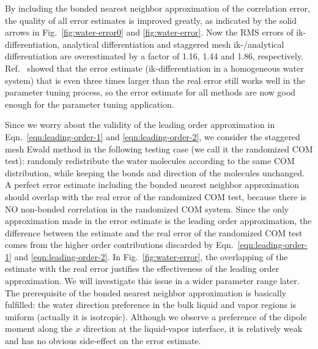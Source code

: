 \documentclass[aps,pre,preprint,unsortedaddress]{revtex4}
\newcommand{\recheck}[1]{{\color{red} #1}}
\begin{document}
By including the \recheck{bonded} nearest neighbor approximation of the 
correlation error, the quality of all error estimates is improved greatly,
as indicated by the solid arrows in Fig.~\ref{fig:water-error0} and \ref{fig:water-error}.
Now the RMS errors of ik-differentiation, analytical differentiation
and staggered mesh ik-/analytical differentiation
are overestimated by a factor of 1.16, 1.44 and 1.86,
respectively.
Ref.~\cite{wang2010optimizing} showed that the error estimate
(ik-differentiation in a homogeneous water system) that
is even three times larger than the real error
still works well in the parameter tuning process, 
so the error estimate for  all methods are now good enough
for the parameter tuning application.
\recheck{
  Since we
  worry about the validity of the leading order
  approximation in
  Eqn.~\eqref{eqn:leading-order-1} and \eqref{eqn:leading-order-2},
  we consider 
  the staggered mesh Ewald method in the following testing case
  (we call it the randomized COM test):
  randomly redistribute the water molecules according to the same
  COM distribution, while keeping
  the bonds and direction of the molecules unchanged.
  A perfect error estimate including the bonded nearest neighbor
  approximation
  should overlap with the real error of the randomized COM test,
  because there is NO non-bonded correlation in the randomized COM system.
  Since the only approximation made in the error estimate
  is the leading order approximation, the difference between
  the estimate and the real error of the randomized COM test
  comes from the higher order contributions discarded by
  Eqn.~\eqref{eqn:leading-order-1} and \eqref{eqn:leading-order-2}.
  In Fig.~\ref{fig:water-error}, the overlapping of the estimate
  with the real error justifies the effectiveness of the
  leading order approximation. We will investigate this issue
  in a wider parameter range later.
  The prerequisite of the bonded nearest neighbor approximation
  is basically fulfilled:
  the water direction preference in the bulk liquid and
  vapor regions is uniform (actually it is isotropic).
  Although
  we observe a preference of the dipole moment along the $x$ direction
  at the liquid-vapor interface, it is relatively weak and has  no
  obvious side-effect on the error estimate.

}
\end{document}
